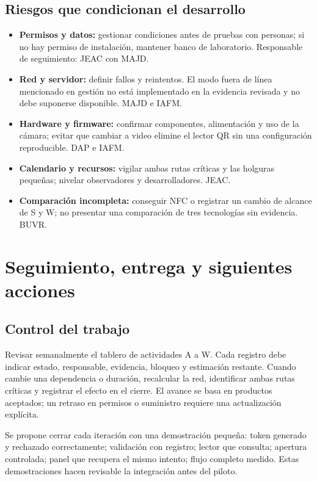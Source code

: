 \documentclass[11pt,letterpaper]{article}
\newcommand{\pagina}[1]{\clearpage\section{#1}}
\begin{document}
\subsection{Riesgos que condicionan el desarrollo}
\begin{itemize}
\item \textbf{Permisos y datos:} gestionar condiciones antes de pruebas con personas; si no hay permiso de instalación, mantener banco de laboratorio. Responsable de seguimiento: JEAC con MAJD.
\item \textbf{Red y servidor:} definir fallos y reintentos. El modo fuera de línea mencionado en gestión no está implementado en la evidencia revisada y no debe suponerse disponible. MAJD e IAFM.
\item \textbf{Hardware y firmware:} confirmar componentes, alimentación y uso de la cámara; evitar que cambiar a video elimine el lector QR sin una configuración reproducible. DAP e IAFM.
\item \textbf{Calendario y recursos:} vigilar ambas rutas críticas y las holguras pequeñas; nivelar observadores y desarrolladores. JEAC.
\item \textbf{Comparación incompleta:} conseguir NFC o registrar un cambio de alcance de S y W; no presentar una comparación de tres tecnologías sin evidencia. BUVR.
\end{itemize}

\pagina{Seguimiento, entrega y siguientes acciones}
\subsection{Control del trabajo}
Revisar semanalmente el tablero de actividades A a W. Cada registro debe indicar estado, responsable, evidencia, bloqueo y estimación restante. Cuando cambie una dependencia o duración, recalcular la red, identificar ambas rutas críticas y registrar el efecto en el cierre. El avance se basa en productos aceptados; un retraso en permisos o suministro requiere una actualización explícita.

Se propone cerrar cada iteración con una demostración pequeña: token generado y rechazado correctamente; validación con registro; lector que consulta; apertura controlada; panel que recupera el mismo intento; flujo completo medido. Estas demostraciones hacen revisable la integración antes del piloto.
\end{document}
